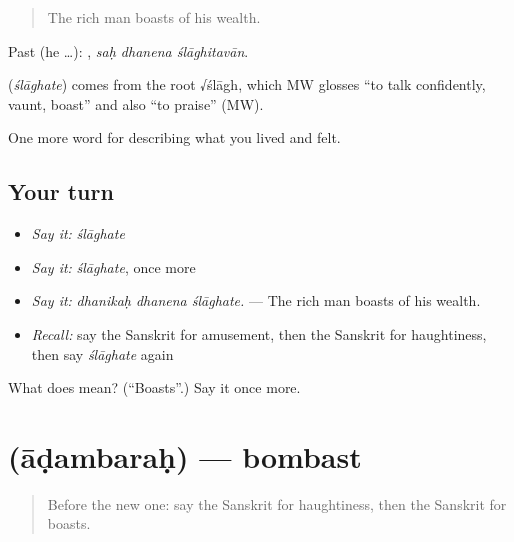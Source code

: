 \begin{quote}
The rich man boasts of his wealth.
\end{quote}

Past (he …):   , \emph{saḥ dhanena ślāghitavān}.

\begin{cousinweb}
\textbf{} (\emph{ślāghate}) comes from the root √ślāgh, which MW glosses \textquotedblleft{}to talk confidently, vaunt, boast\textquotedblright{} and also \textquotedblleft{}to praise\textquotedblright{} (MW).
\end{cousinweb}

\begin{grammarlens}[title={What you've built}]
One more word for describing what you lived and felt.
\end{grammarlens}

\subsection*{Your turn}
\begin{itemize}
\raggedright
  \item \emph{Say it:} \emph{ślāghate}
  \item \emph{Say it:} \emph{ślāghate}, once more
  \item \emph{Say it:} \emph{dhanikaḥ dhanena ślāghate.} — The rich man boasts of his wealth.
  \item \emph{Recall:} say the Sanskrit for amusement, then the Sanskrit for haughtiness, then say \emph{ślāghate} again
\end{itemize}

\begin{tcolorbox}[breakable,colback=teal!4,colframe=teal!35!black,title={Before you move on}]
What does  mean? (\textquotedblleft{}Boasts\textquotedblright{}.) Say it once more.
\end{tcolorbox}
\section[\texorpdfstring{\sk{आडम्बरः} (āḍambaraḥ)}{आडम्बरः (āḍambaraḥ)}]{ (āḍambaraḥ) — bombast}

\label{lesson:SA-C458-adambarah}



\begin{quote}
Before the new one: say the Sanskrit for haughtiness, then the Sanskrit for boasts.
\end{quote}

